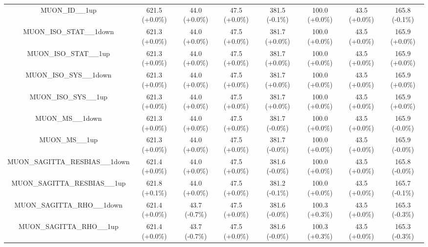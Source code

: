 \begin{table}[htbp!]
\begin{tiny}
\begin{center}
\begin{tabular}{c|c|c|c||c|c|c|c}
MUON\_ID\_\_1up                                              & 621.5     (+0.0\%) & 44.0      (+0.0\%) & 47.5      (+0.0\%) & 381.5     (-0.1\%) & 100.0     (+0.0\%) & 43.5      (+0.0\%) & 165.8     (-0.1\%) \\ 
MUON\_ISO\_STAT\_\_1down                                     & 621.3     (+0.0\%) & 44.0      (+0.0\%) & 47.5      (+0.0\%) & 381.7     (+0.0\%) & 100.0     (+0.0\%) & 43.5      (+0.0\%) & 165.9     (+0.0\%) \\ 
MUON\_ISO\_STAT\_\_1up                                       & 621.3     (+0.0\%) & 44.0      (+0.0\%) & 47.5      (+0.0\%) & 381.7     (+0.0\%) & 100.0     (+0.0\%) & 43.5      (+0.0\%) & 165.9     (+0.0\%) \\ 
MUON\_ISO\_SYS\_\_1down                                      & 621.3     (+0.0\%) & 44.0      (+0.0\%) & 47.5      (+0.0\%) & 381.7     (+0.0\%) & 100.0     (+0.0\%) & 43.5      (+0.0\%) & 165.9     (+0.0\%) \\ 
MUON\_ISO\_SYS\_\_1up                                        & 621.3     (+0.0\%) & 44.0      (+0.0\%) & 47.5      (+0.0\%) & 381.7     (+0.0\%) & 100.0     (+0.0\%) & 43.5      (+0.0\%) & 165.9     (+0.0\%) \\ 
MUON\_MS\_\_1down                                            & 621.3     (+0.0\%) & 44.0      (+0.0\%) & 47.5      (+0.0\%) & 381.7     (-0.0\%) & 100.0     (+0.0\%) & 43.5      (+0.0\%) & 165.9     (-0.0\%) \\ 
MUON\_MS\_\_1up                                              & 621.3     (+0.0\%) & 44.0      (+0.0\%) & 47.5      (+0.0\%) & 381.7     (-0.0\%) & 100.0     (+0.0\%) & 43.5      (+0.0\%) & 165.9     (-0.0\%) \\ 
MUON\_SAGITTA\_RESBIAS\_\_1down                              & 621.4     (+0.0\%) & 44.0      (+0.0\%) & 47.5      (+0.0\%) & 381.6     (-0.0\%) & 100.0     (+0.0\%) & 43.5      (+0.0\%) & 165.8     (-0.0\%) \\ 
MUON\_SAGITTA\_RESBIAS\_\_1up                                & 621.8     (+0.1\%) & 44.0      (+0.0\%) & 47.5      (+0.0\%) & 381.2     (-0.1\%) & 100.0     (+0.0\%) & 43.5      (+0.0\%) & 165.7     (-0.1\%) \\ 
MUON\_SAGITTA\_RHO\_\_1down                                  & 621.4     (+0.0\%) & 43.7      (-0.7\%) & 47.5      (+0.0\%) & 381.6     (-0.0\%) & 100.3     (+0.3\%) & 43.5      (+0.0\%) & 165.3     (-0.3\%) \\ 
MUON\_SAGITTA\_RHO\_\_1up                                    & 621.4     (+0.0\%) & 43.7      (-0.7\%) & 47.5      (+0.0\%) & 381.6     (-0.0\%) & 100.3     (+0.3\%) & 43.5      (+0.0\%) & 165.3     (-0.3\%) \\ 

\end{tabular}
\end{center}
\end{tiny}
\end{table}
